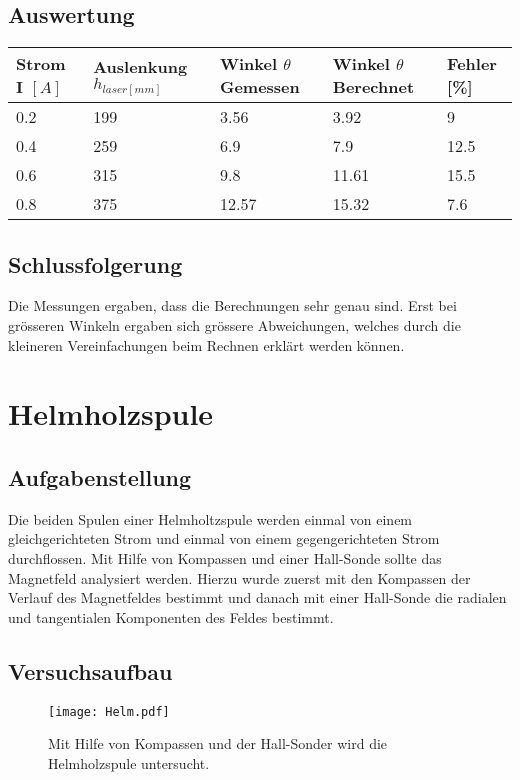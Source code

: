 \documentclass{article}
\begin{document}
\subsection{Auswertung}
\begin{table}[H]
	\begin{tabular}{|l|l|l|l|l|}
		\hline
		Strom I $[A]$ & Auslenkung $h_{laser[mm]}$ & Winkel $\theta$ Gemessen & Winkel $\theta$ Berechnet & Fehler [\%] \\ \hline
		0.2           & 199        & 3.56   & 3.92   & 9      \\ 
		0.4           & 259        & 6.9    & 7.9    & 12.5   \\ 
		0.6           & 315        & 9.8    & 11.61  & 15.5   \\ 
		0.8           & 375        & 12.57  & 15.32  & 7.6    \\
		\hline
	\end{tabular}
\end{table}
\subsection{Schlussfolgerung}
Die Messungen ergaben, dass die Berechnungen sehr genau sind. Erst bei grösseren Winkeln ergaben sich grössere Abweichungen, welches durch die kleineren Vereinfachungen beim Rechnen erklärt werden können. 
\newpage
\section{Helmholzspule}
\subsection{Aufgabenstellung}
Die beiden Spulen einer Helmholtzspule werden einmal von einem gleichgerichteten Strom und einmal
von einem gegengerichteten Strom durchflossen. Mit Hilfe von Kompassen und einer Hall-Sonde
sollte das Magnetfeld analysiert werden. Hierzu wurde zuerst mit den Kompassen der Verlauf des
Magnetfeldes bestimmt und danach mit einer Hall-Sonde die radialen und tangentialen Komponenten
des Feldes bestimmt.

\subsection{Versuchsaufbau}
\begin{figure}[H]
	\centering
	\texttt{[image: Helm.pdf]} 
	\caption{Mit Hilfe von Kompassen und der Hall-Sonder wird die Helmholzspule untersucht. }
\end{figure}
\newpage
\end{document}
